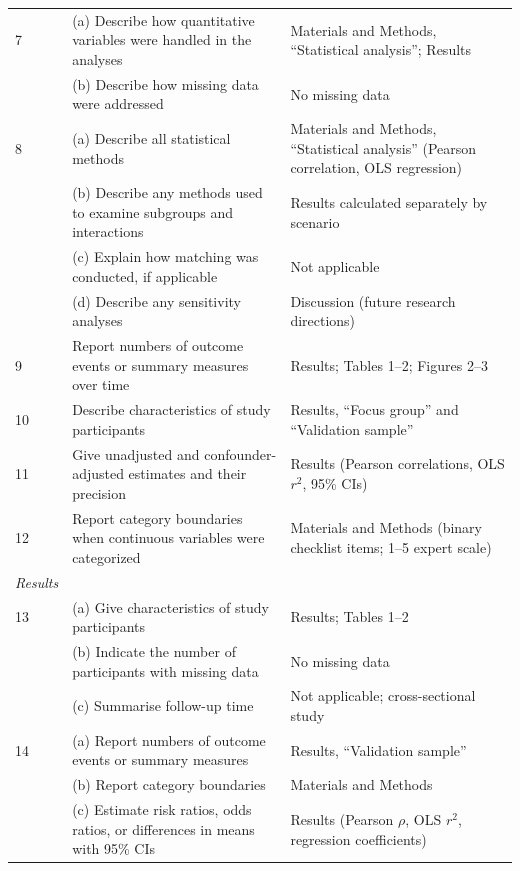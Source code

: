 \documentclass{article}
\begin{document}
\begin{singlespace}
\begin{longtable}{p{}p{}p{}}
7 & (a) Describe how quantitative variables were handled in the analyses & Materials and Methods, ``Statistical analysis''; Results \\
  & (b) Describe how missing data were addressed & No missing data \\

8 & (a) Describe all statistical methods & Materials and Methods, ``Statistical analysis'' (Pearson correlation, OLS regression) \\
  & (b) Describe any methods used to examine subgroups and interactions & Results calculated separately by scenario \\
  & (c) Explain how matching was conducted, if applicable & Not applicable \\
  & (d) Describe any sensitivity analyses & Discussion (future research directions) \\

9 & Report numbers of outcome events or summary measures over time & Results; Tables 1--2; Figures 2--3 \\

10 & Describe characteristics of study participants & Results, ``Focus group'' and ``Validation sample'' \\

11 & Give unadjusted and confounder-adjusted estimates and their precision & Results (Pearson correlations, OLS $r^{2}$, 95\% CIs) \\

12 & Report category boundaries when continuous variables were categorized & Materials and Methods (binary checklist items; 1--5 expert scale) \\

\midrule
\textit{Results} & & \\
\midrule

13 & (a) Give characteristics of study participants & Results; Tables 1--2 \\
  & (b) Indicate the number of participants with missing data & No missing data \\
  & (c) Summarise follow-up time & Not applicable; cross-sectional study \\

14 & (a) Report numbers of outcome events or summary measures & Results, ``Validation sample'' \\
  & (b) Report category boundaries & Materials and Methods \\
  & (c) Estimate risk ratios, odds ratios, or differences in means with 95\% CIs & Results (Pearson $\rho$, OLS $r^{2}$, regression coefficients) \\


\end{longtable}
\end{singlespace}
\end{document}
